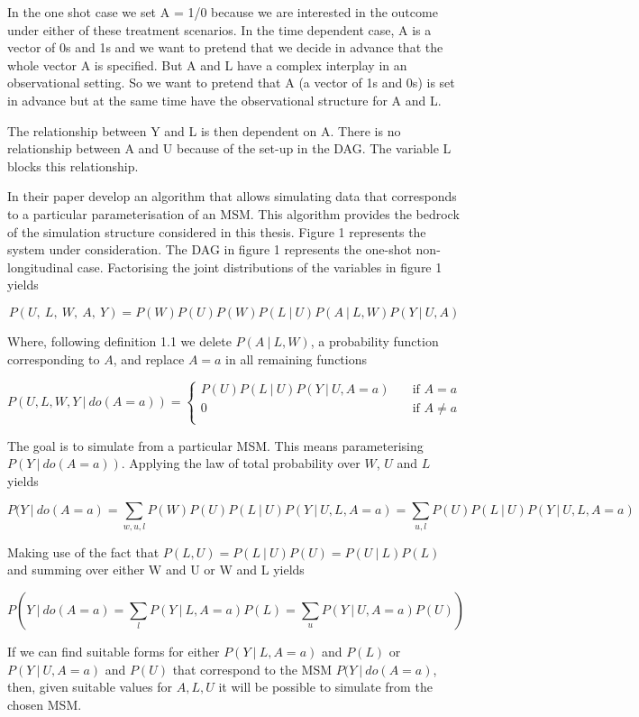 \documentclass[11pt]{article}
\begin{document}
In the one shot case we set A = 1/0 because we are interested in the
outcome under either of these treatment scenarios. In the time dependent
case, A is a vector of 0s and 1s and we want to pretend that we decide
in advance that the whole vector A is specified. But A and L have a
complex interplay in an observational setting. So we want to pretend
that A (a vector of 1s and 0s) is set in advance but at the same time
have the observational structure for A and L.

The relationship between Y and L is then dependent on A. There is no
relationship between A and U because of the set-up in the DAG. The
variable L blocks this relationship.

In their paper \citet{Havercroft2012} develop an algorithm that allows
simulating data that corresponds to a particular parameterisation of an
MSM. This algorithm provides the bedrock of the simulation structure
considered in this thesis. Figure 1 represents the system under
consideration. The DAG in figure 1 represents the one-shot
non-longitudinal case. Factorising the joint distributions of the
variables in figure 1 yields

\[P(U,\ L,\ W,\ A,\ Y) = P(W)P(U)P(W)P(L\ |\ U)P(A\ |\ L,W)P(Y\ |\ U,A)\]

Where, following definition 1.1 we delete \(P(A\ |\ L,W)\), a
probability function corresponding to \(A\), and replace \(A=a\) in all
remaining functions

\[ P(U, L, W, Y\ |\ do(A=a)) =
  \begin{cases}
    P(U)P(L\ |\ U)P(Y\ |\ U,A = a) & \quad \text{if } A = a\\
    0  & \quad \text{if } A \neq a\\
  \end{cases}
\]

The goal is to simulate from a particular MSM. This means parameterising
\(P(Y\ |\ do(A=a))\). Applying the law of total probability over \(W\),
\(U\) and \(L\) yields

\[P(Y\ |\ do(A=a) = \sum_{w, u, l} P(W)P(U)P(L\ |\ U)P(Y\ |\ U, L, A=a) = \sum_{u, l} P(U)P(L\ |\ U)P(Y\ |\ U, L, A=a)\]

Making use of the fact that
\(P(L, U) = P(L\ |\  U)P(U) = P(U\ |\ L)P(L)\) and summing over either W
and U or W and L yields

\[P(Y\ |\ do(A=a) = \sum_{l}P(Y\ |\ L, A=a)P(L) = \sum_{u} P(Y\ |\ U, A=a)P(U))\]

If we can find suitable forms for either \(P(Y\ |\ L, A=a)\) and
\(P(L)\) or \(P(Y\ |\ U, A=a)\) and \(P(U)\) that correspond to the MSM
\(P(Y\ |\ do(A=a)\), then, given suitable values for \(A, L, U\) it will
be possible to simulate from the chosen MSM.
\end{document}

